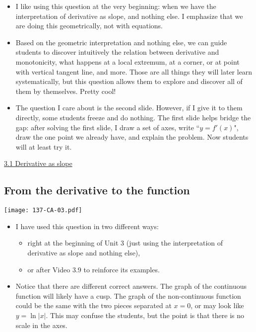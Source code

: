\documentclass[11pt]{article}
\newcommand {\DS} [1] {${\displaystyle #1}$}
\newcommand{\nl}{\hfill \vspace{-1.1\baselineskip}} %
\newcommand{\vi}{\hspace{8mm} \href{https://www.youtube.com/watch?v=7vhux5TLRmQ&list=PLlwePzQY_wW8qiZD6XYqCnibdY37ygbx7&index=1}{3.1 Derivative as slope}}
\begin{document}
\begin{comments}
\nl
	\begin{itemize}
		\item  I like using this question at the very beginning: when we have the interpretation of derivative as slope, and nothing else.  I emphasize that we are doing this geometrically, not with equations.  
		\item Based on the geometric interpretation and nothing else, we can guide students to discover intuitively the relation between derivative and monotonicity, what happens at a local extremum, at a corner, or at point with vertical tangent line, and more. Those are all things they will later learn systematically, but this question allows them to explore and discover all of them by themselves.  Pretty cool!
		\item The question I care about is the second slide.  However, if I give it to them directly, some students freeze and do nothing.  The first slide helps bridge the gap: after solving the first slide, I draw a set of axes, write ``\DS{y=f'(x)}", draw the one point we already have, and explain the problem.  Now students will at least try it.
	\end{itemize}
	
\end{comments}

\begin{videos}
\vi
\end{videos}



\newpage
\subsection{From the derivative to the function} 

\begin{center}
{ \texttt{[image: 137-CA-03.pdf]}} 
\end{center}


\begin{comments}
\nl
	\begin{itemize}
		\item  I have used this question in two different ways:
			\begin{itemize}
				\item right at the beginning of Unit 3 (just using the interpretation of derivative as slope and nothing else),
				\item or after Video 3.9 to reinforce its examples.
			\end{itemize}
		\item Notice that there are different correct answers.  The graph of the continuous function will likely have a cusp.  The graph of the non-continuous function could be the same with the two pieces separated at $x=0$, or may look like \DS{y = \ln |x|}.  This may confuse the students, but the point is that there is no scale in the axes.
	\end{itemize}
		
\end{comments}
\end{document}
